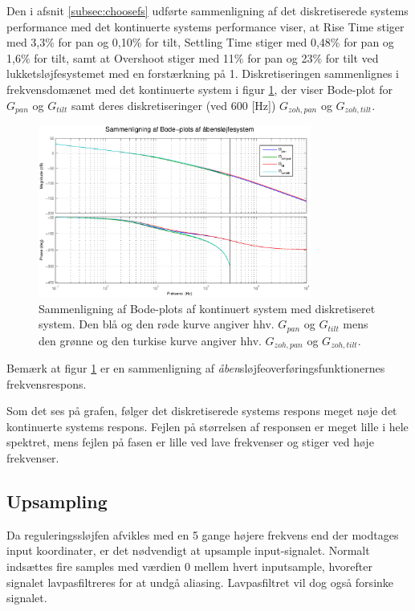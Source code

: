 Den i afsnit \ref{subsec:choosefs} udførte sammenligning af det diskretiserede systems performance
med det kontinuerte systems performance viser,
at Rise Time stiger med 3,3\% for pan og 0,10\% for tilt,
Settling Time stiger med 0,48\% for pan og 1,6\% for tilt,
samt at Overshoot stiger med 11\% for pan og 23\% for tilt
ved lukketsløjfesystemet med en forstærkning på 1.
Diskretiseringen sammenlignes i frekvensdomænet med det kontinuerte system
i figur \ref{fig:diskretBode}, der viser Bode-plot for \(G_{pan}\) og \(G_{tilt}\) samt
deres diskretiseringer (ved 600 [Hz]) \(G_{zoh,pan}\) og \(G_{zoh,tilt}\).
\begin{figure}[!th]
\centering
	\includegraphics[width=0.8\textwidth]{./graphics/diskretBode.eps}
	\captionsetup{width=0.7\textwidth}
\caption[Sammenligning af Bode-plots]
{Sammenligning af Bode-plots af kontinuert system med diskretiseret system.
Den blå og den røde kurve angiver hhv. \(G_{pan}\) og \(G_{tilt}\) mens
den grønne og den turkise kurve angiver hhv. \(G_{zoh,pan}\) og \(G_{zoh,tilt}\).
}
\label{fig:diskretBode}
\end{figure}
Bemærk at figur \ref{fig:diskretBode} er en sammenligning af \textit{åben}sløjfeoverføringsfunktionernes
frekvensrespons.

Som det ses på grafen, følger det diskretiserede systems respons meget nøje det kontinuerte systems respons.
Fejlen på størrelsen af responsen er meget lille i hele spektret,
mens fejlen på fasen er lille ved lave frekvenser og stiger ved høje frekvenser.

\subsection{Upsampling}
\label{subsec:upsampling}
Da reguleringssløjfen afvikles med en 5 gange højere frekvens end der modtages input koordinater, er det nødvendigt at upsample input-signalet. 
Normalt indsættes fire samples med værdien 0 mellem hvert inputsample, hvorefter signalet lavpasfiltreres for at undgå aliasing. Lavpasfiltret vil dog også forsinke signalet. 

